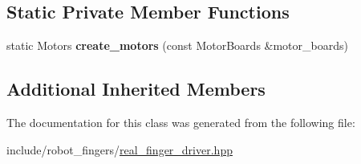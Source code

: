 \subsection*{Static Private Member Functions}
\begin{DoxyCompactItemize}
\item 
\mbox{\label{classrobot__fingers_1_1RealFingerDriver_a5680b7497c3b3ceeba5f67346025aef1}} 
static Motors {\bfseries create\+\_\+motors} (const Motor\+Boards \&motor\+\_\+boards)
\end{DoxyCompactItemize}
\subsection*{Additional Inherited Members}


The documentation for this class was generated from the following file\+:\begin{DoxyCompactItemize}
\item 
include/robot\+\_\+fingers/\hyperlink{real__finger__driver_8hpp}{real\+\_\+finger\+\_\+driver.\+hpp}\end{DoxyCompactItemize}
